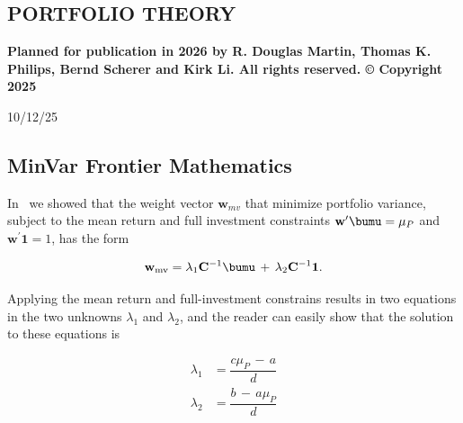 \documentclass[graybox,envcountchap,sectrefs]{svmono}\usepackage[]{graphicx}\usepackage[]{xcolor}
\begin{document}
\begin{appendices}


\setcounter{chapter}{3} 

\chapter{PORTFOLIO THEORY\label{chap:AppendixD}}

\vspace{0.3in}

\textbf{Planned for publication in 2026 by R. Douglas Martin, Thomas
K. Philips, Bernd Scherer and Kirk Li. All rights reserved. © Copyright
2025}

\vspace{0.3in}

\begin{center}
10/12/25
\par\end{center}

\tocchpnum=30pt 
\tocsecnum=33pt 
\tocsubsecnum=40pt 
\tocsubsubsecnum=48pt 
\tocparanum=55pt 
\tocsubparanum=63pt
\calctocindent

\tableofcontents{}\newpage{}

\section{MinVar Frontier Mathematics\label{sec: minVarMath}}

In \GlobalMinVarPortfolios\ we showed that the weight vector $\mathbf{w}_{mv}$
that minimize portfolio variance, subject to the mean return and full
investment constraints $\mathbf{w}^{\prime}\bumu=\mu_{P}$ and $\mathbf{w}^{\prime}\mathbf{1}=1$,
has the form

\begin{equation}
\mathbf{w}_{\mathrm{mv}}=\lambda_{1}\mathbf{C}^{-1}\bumu\,+\,\lambda_{2}\mathbf{C}^{-1}\boldsymbol{1}.\label{eq: minVarWtVectorGeneralForm}
\end{equation}

Applying the mean return and full-investment constrains results in
two equations in the two unknowns $\lambda_{1}$ and $\lambda_{2}$,
and the reader can easily show that the solution to these equations
is

\begin{equation}
\begin{alignedat}{1}\lambda_{1} & =\dfrac{c\mu_{P}\,-\,a}{d}\\
\lambda_{2} & =\dfrac{b\,-\,a\mu_{P}}{d}
\end{alignedat}
\label{eq: theTwoLamdas}
\end{equation}


\end{appendices}
\end{document}
